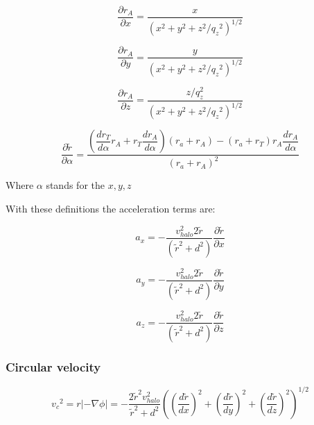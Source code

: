 \begin{equation}
\dfrac{\partial r_A}{\partial x} = \dfrac{x}{(x^2 + y^2 + z^2/{q_z}^2)^{1/2}}
\end{equation}

\begin{equation}
\dfrac{\partial r_A}{\partial y} = \dfrac{y}{(x^2 + y^2 + z^2/{q_z}^2)^{1/2}}
\end{equation}

\begin{equation}
\dfrac{\partial r_A}{\partial z} = \dfrac{z/q_z^2}{(x^2 + y^2 + z^2/{q_z}^2)^{1/2}}
\end{equation}

\begin{equation}
\dfrac{\partial \tilde{r}}{\partial \alpha} = \dfrac{\left( \dfrac{dr_T}{d\alpha} r_A + r_T \dfrac{dr_A}{d\alpha}\right) (r_a + r_A) - (r_a + r_T)r_A \dfrac{dr_A}{d\alpha} }{(r_a + r_A)^2}
\end{equation}

Where $\alpha$ stands for the $x, y, z$

With these definitions the acceleration terms are:

\begin{equation}
a_x = - \dfrac{v_{halo}^2 2 \tilde{r}}{(\tilde{r}^2 + d^2)} \dfrac{\partial \tilde{r}}{\partial x}
\end{equation}

\begin{equation}
a_y = - \dfrac{v_{halo}^2 2 \tilde{r}}{(\tilde{r}^2 + d^2)} \dfrac{\partial \tilde{r}}{\partial y}
\end{equation}

\begin{equation}
a_z = - \dfrac{v_{halo}^2 2 \tilde{r}}{(\tilde{r}^2 + d^2)} \dfrac{\partial \tilde{r}}{\partial z}
\end{equation}

\subsubsection{Circular velocity}

\begin{equation}
{v_c}^2 = r|-\nabla \phi|  = - \dfrac{2 \tilde{r}^2 v_{halo}^2}{\tilde{r}^2  + d^2} \left( \left( \dfrac{d\tilde{r} }{dx}\right)^2 + \left( \dfrac{d\tilde{r} }{dy}\right)^2 + \left( \dfrac{d\tilde{r} }{dz}\right)^2  \right)^{1/2} 
\end{equation}




